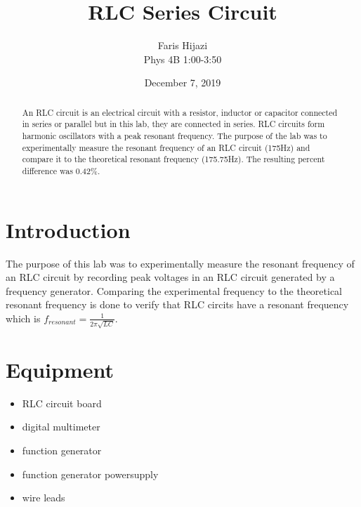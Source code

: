 \documentclass[letterpaper, 12pt]{article}
\title{RLC Series Circuit}
\date{December 7, 2019}
\author{Faris Hijazi\\
        Phys 4B 1:00-3:50\\}
\begin{document}
\begin{titlingpage}
    \maketitle
    \begin{abstract}
        An RLC circuit is an electrical circuit with a resistor, inductor or capacitor 
 connected in series or parallel but in this lab, they are connected in series.
 RLC circuits form harmonic oscillators with a peak resonant frequency. The purpose of the 
 lab was to experimentally measure the resonant frequency of an RLC circuit (175Hz) and 
 compare it to the theoretical resonant frequency (175.75Hz). The resulting percent difference
 was 0.42\%.
    \end{abstract}
\end{titlingpage}


\section*{Introduction} 
The purpose of this lab was to experimentally measure 
the resonant frequency of an RLC circuit by recording peak voltages
in an RLC circuit generated by a frequency generator.
Comparing the experimental frequency to the theoretical resonant 
frequency is done to verify that RLC circits have a resonant frequency which is 
$f_{resonant} = \frac{1}{2 \pi \sqrt{L C}}$. 


\section*{Equipment}

\begin{itemize}
    \item RLC circuit board
    \item digital multimeter
    \item function generator
    \item function generator powersupply
    \item wire leads
\end{itemize}
\end{document}

